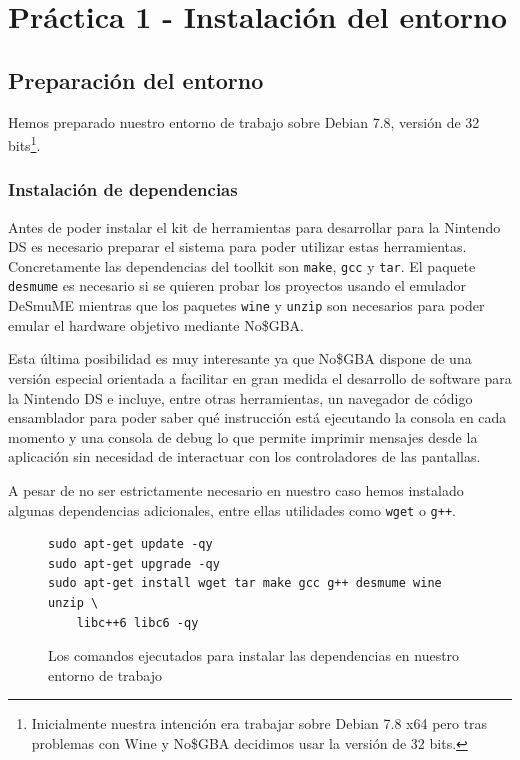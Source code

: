 \section{Práctica 1 - Instalación del entorno}

\subsection{Preparación del entorno}
    
Hemos preparado nuestro entorno de trabajo sobre Debian 7.8, versión de 32 bits\footnote{Inicialmente nuestra intención era trabajar sobre Debian 7.8 x64 pero tras problemas con Wine y No\$GBA decidimos usar la versión de 32 bits.}.
        
\subsubsection{Instalación de dependencias}

Antes de poder instalar el kit de herramientas para desarrollar para la Nintendo DS es necesario preparar el sistema para poder utilizar estas herramientas. Concretamente las dependencias del toolkit son {\tt make}, {\tt gcc} y {\tt tar}. El paquete {\tt desmume} es necesario si se quieren probar los proyectos usando el emulador  DeSmuME mientras que los paquetes {\tt wine} y {\tt unzip} son necesarios para poder emular el hardware objetivo mediante No\$GBA.

Esta última posibilidad es muy interesante ya que No\$GBA dispone de una versión especial orientada a facilitar en gran medida el desarrollo de software para la Nintendo DS e incluye, entre otras herramientas, un navegador de código ensamblador para poder saber qué instrucción está ejecutando la consola en cada momento y una consola de debug lo que permite imprimir mensajes desde la aplicación sin necesidad de interactuar con los controladores de las pantallas.

A pesar de no ser estrictamente necesario en nuestro caso hemos instalado algunas dependencias adicionales, entre ellas utilidades como {\tt wget} o {\tt g++}.
	
\begin{figure}[ht]
\begin{mdframed}[style=exampledefault]
\begin{verbatim}
sudo apt-get update -qy
sudo apt-get upgrade -qy
sudo apt-get install wget tar make gcc g++ desmume wine unzip \
    libc++6 libc6 -qy
\end{verbatim}
\end{mdframed}

	\caption{Los comandos ejecutados para instalar las dependencias en nuestro entorno de trabajo}
	\label{fig:installDependencies}
\end{figure}
	
